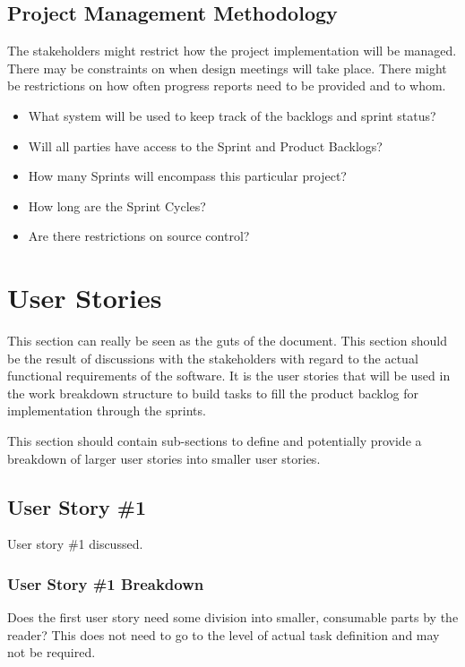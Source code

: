 \subsection{Project  Management Methodology}
The stakeholders might restrict how the project implementation will be managed. 
 There may be constraints on when design meetings will take place.  There might 
be restrictions on how often progress reports need to be provided and to whom. 
 
\begin{itemize}
\item What system will be used to keep track of the backlogs and sprint status?
\item Will all parties have access to the Sprint and Product Backlogs?
\item How many Sprints will encompass this particular project?
\item How long are the Sprint Cycles?
\item Are there restrictions on source control? 
\end{itemize}

\section{User Stories}
This section can really be seen as the guts of the document.  This section should 
be the result of discussions with the stakeholders with regard to the actual functional 
requirements of the software.  It is the user stories that will be used in the 
work breakdown structure to build tasks to fill the product backlog for implementation 
through the sprints.

This section should contain sub-sections to define and potentially provide a breakdown 
of larger user stories into smaller user stories. 



\subsection{User Story \#1}
User story \#1 discussed. 

\subsubsection{User Story \#1 Breakdown}
Does the first user story need some division into smaller, consumable parts by 
the reader?  This does not need to go to the level of actual task definition and 
may not be required. 

